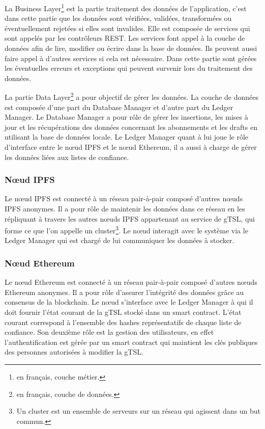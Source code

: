 \documentclass{tnreport}
\begin{document}
La Business Layer\footnote{en français, couche métier.} est la partie traitement des données de l'application, c'est dans cette partie que les données sont vérifiées, validées, transformées ou éventuellement rejetées si elles sont invalides. Elle est composée de services qui sont appelés par les contrôleurs REST. Les services font appel à la couche de données afin de lire, modifier ou
écrire dans la base de données. Ils peuvent aussi faire appel à d'autres services si cela est nécessaire. Dans cette partie sont gérées les éventuelles erreurs et exceptions qui peuvent survenir lors du traitement des données.

La partie Data Layer\footnote{en français, couche de données.} a pour objectif de gérer les données. La couche de données est composée d'une part du Database Manager et d'autre part du Ledger Manager. Le Database Manager a pour rôle de gérer les insertions, les mises à jour et les récupérations des données concernant les abonnements et les drafts en utilisant la base de données locale. Le Ledger Manager quant à lui joue le rôle d'interface entre le nœud IPFS et le nœud Ethereum, il a aussi à charge de gérer les données liées aux listes de confiance.

\subsubsection{Nœud IPFS}

Le nœud IPFS est connecté à un réseau pair-à-pair composé d'autres nœuds IPFS anonymes. Il a pour rôle de maintenir les données dans ce réseau en les répliquant à travers les autres nœuds IPFS appartenant au service de gTSL, qui forme ce que l'on appelle un cluster\footnote{Un cluster est un ensemble de serveurs sur un réseau qui agissent dans un but commun.}. Le nœud interagit avec le système via le Ledger Manager qui est chargé de lui communiquer les données à stocker.

\subsubsection{Nœud Ethereum}

Le nœud Ethereum est connecté à un réseau pair-à-pair composé d'autres nœuds Ethereum anonymes. Il a pour rôle d'assurer l'intégrité des données grâce au consensus de la blockchain. Le nœud s'interface avec le Ledger Manager à qui il doit fournir l'état courant de la gTSL stocké dans un smart contract. L'état courant correspond à l'ensemble des hashes représentatifs de chaque liste de confiance. Son deuxième rôle est la gestion des utilisateurs, en effet l'authentification est gérée par un smart contract qui maintient les clés publiques des personnes autorisées à modifier la gTSL.
\end{document}
